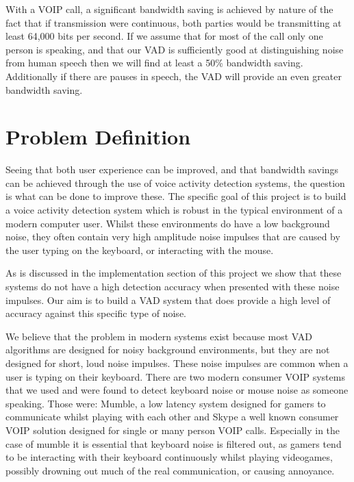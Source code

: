 \documentclass[ %
                    author={Sam Phippen},
                supervisor={Dr. Rafal Bogacz},
                     title={Real time voice activity detectors in noisy personal computing environments},
                  subtitle={},
                    degree={MEng},
                      year={2012} ]{thesis}
\begin{document}
With a VOIP call, a significant bandwidth saving is achieved by nature of the
fact that if transmission were continuous, both parties would be transmitting
at least 64,000 bits per second\cite{ciscovad}. If we assume that for most of
the call only one person is speaking, and that our VAD is sufficiently good at
distinguishing noise from human speech then we will find at least a 50\%
bandwidth saving. Additionally if there are pauses in speech, the VAD will
provide an even greater bandwidth saving.


\section{Problem Definition}

Seeing that both user experience can be improved, and that bandwidth savings
can be achieved through the use of voice activity detection systems, the
question is what can be done to improve these. The specific goal of this
project is to build a voice activity detection system which is robust in the
typical environment of a modern computer user. Whilst these environments do
have a low background noise, they often contain very high amplitude noise
impulses that are caused by the user typing on the keyboard, or interacting
with the mouse.

As is discussed in the implementation section of this project we show that
these systems do not have a high detection accuracy when presented with these
noise impulses. Our aim is to build a VAD system that does provide a high level
of accuracy against this specific type of noise.

We believe that the problem in modern systems exist because most VAD algorithms
are designed for noisy background environments\cite{shin}, but they are not
designed for short, loud noise impulses. These noise impulses are common when a
user is typing on their keyboard. There are two modern consumer VOIP systems
that we used and were found to detect keyboard noise or mouse noise as someone
speaking. Those were: Mumble\cite{mumble}, a low latency system designed for
gamers to communicate whilst playing with each other and
Skype\texttrademark\cite{skype} a well known consumer VOIP solution designed
for single or many person VOIP calls. Especially in the case of mumble it is
essential that keyboard noise is filtered out, as gamers tend to be interacting
with their keyboard continuously whilst playing videogames, possibly drowning
out much of the real communication, or causing annoyance.
\end{document}
